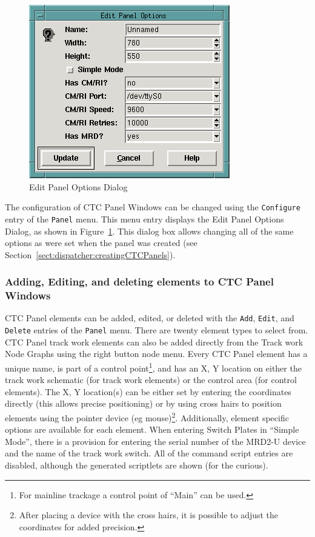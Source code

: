 \begin{figure}[hbpt]
\begin{centering}
\includegraphics{DISPEditPanelOptions.png}
\caption{Edit Panel Options Dialog}
\label{fig:dispatcher:editPanelOptsDialog}
\end{centering}
\end{figure}
The configuration of CTC Panel Windows can be changed using the
\verb=Configure= entry of the \verb=Panel= menu.  This menu entry
displays the Edit Panel Options Dialog, as shown in
Figure~\ref{fig:dispatcher:editPanelOptsDialog}. This dialog box allows
changing all of the same options as were set when the panel was created
(see Section~\ref{sect:dispatcher:creatingCTCPanels}).

\subsubsection{Adding, Editing, and deleting elements to CTC Panel Windows}
\label{sect:dispatcher:addeditdeletePanelElements}

CTC Panel elements can be added, edited, or deleted with the
\verb=Add=, \verb=Edit=, and \verb=Delete= entries of the \verb=Panel=
menu. There are twenty element types to select from.  CTC Panel
track work elements can also be added directly from the Track work Node
Graphs using the right button node menu.  Every CTC Panel element has a
unique name, is part of a control point\footnote{For mainline trackage
a control point of ``Main'' can be used.}, and has an X, Y location on
either the track work schematic (for track work elements) or the control
area (for control elements). The X, Y location(s) can be either set by
entering the coordinates directly (this allows precise positioning) or
by using cross hairs to position elements using the pointer device (eg
mouse)\footnote{After placing a device with the cross hairs, it is
possible to adjust the coordinates for added precision.}. Additionally,
element specific options are available for each element. When entering
Switch Plates in ``Simple Mode'', there is a provision for entering the
serial number of the MRD2-U device and the name of the track work
switch.  All of the command script entries are disabled, although the
generated scriptlets are shown (for the curious).


